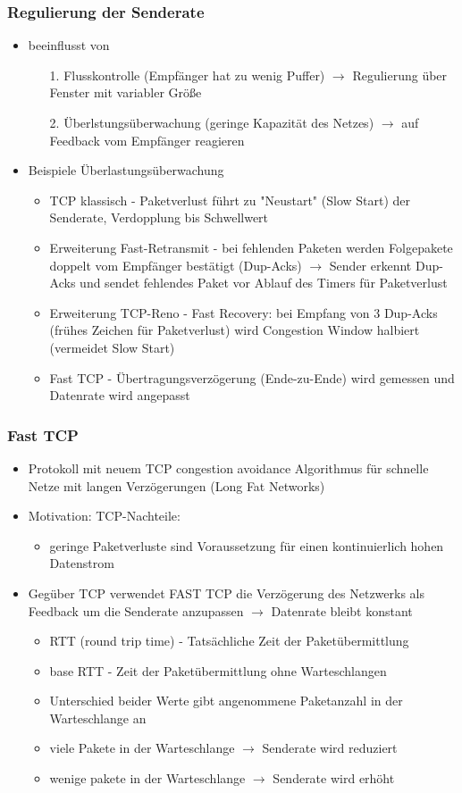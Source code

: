 \subsubsection{Regulierung der Senderate}
\begin{itemize}
	\item beeinflusst von
	\begin{itemize}
		\item[1.] Flusskontrolle (Empfänger hat zu wenig Puffer) $\to $ Regulierung über Fenster mit variabler Größe
		\item[2.] Überlstungsüberwachung (geringe Kapazität des Netzes) $\to$ auf Feedback vom Empfänger reagieren
	\end{itemize}
	\item Beispiele Überlastungsüberwachung
	\begin{itemize}
		\item TCP klassisch - Paketverlust führt zu "Neustart" (Slow Start) der Senderate, Verdopplung bis Schwellwert
		\item Erweiterung Fast-Retransmit - bei fehlenden Paketen werden Folgepakete doppelt vom Empfänger bestätigt (Dup-Acks) $\to$ Sender erkennt Dup-Acks und sendet fehlendes Paket vor Ablauf des Timers für Paketverlust
		\item Erweiterung TCP-Reno - Fast Recovery: bei Empfang von 3 Dup-Acks (frühes Zeichen für Paketverlust) wird Congestion Window halbiert (vermeidet Slow Start)
		\item Fast TCP - Übertragungsverzögerung (Ende-zu-Ende) wird gemessen und Datenrate wird angepasst
	\end{itemize}
\end{itemize}
\subsubsection{Fast TCP}
\begin{itemize}
	\item Protokoll mit neuem TCP congestion avoidance Algorithmus für schnelle Netze mit langen Verzögerungen (Long Fat Networks)
	\item Motivation: TCP-Nachteile:
	\begin{itemize}
		\item geringe Paketverluste sind Voraussetzung für einen kontinuierlich hohen Datenstrom
	\end{itemize}
	\item Gegüber TCP verwendet FAST TCP die Verzögerung des Netzwerks als Feedback um die Senderate anzupassen $\to$ Datenrate bleibt konstant
	\begin{itemize}
		\item RTT (round trip time) - Tatsächliche Zeit der Paketübermittlung
		\item base RTT - Zeit der Paketübermittlung ohne Warteschlangen
		\item Unterschied beider Werte gibt angenommene Paketanzahl in der Warteschlange an
		\item viele Pakete in der Warteschlange $\to$ Senderate wird reduziert
		\item wenige pakete in der Warteschlange $\to$ Senderate wird erhöht
	\end{itemize}
\end{itemize}
